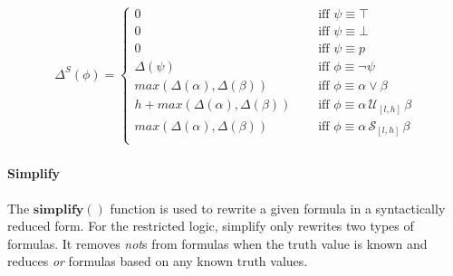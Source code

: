 \documentclass[]{../llncs/llncs}
\begin{document}
\begin{align*}
\Delta^{S}(\phi) = \left\lbrace
\begin{aligned}
0 & \quad \text{ iff } \psi \equiv \top \\
0 & \quad \text{ iff } \psi \equiv \bot \\
0 & \quad \text{ iff } \psi \equiv p \\
\Delta(\psi) & \quad \text{ iff } \phi \equiv \neg \psi \\
max(\Delta(\alpha),\Delta(\beta)) & \quad \text{ iff } \phi \equiv \alpha \vee \beta \\
h + max(\Delta(\alpha),\Delta(\beta)) & \quad \text{ iff } \phi \equiv \alpha\, \mathcal{U}_{[l,h]}\, \beta \\
max(\Delta(\alpha),\Delta(\beta)) & \quad \text{ iff } \phi \equiv \alpha\, \mathcal{S}_{[l,h]}\, \beta \\
\end{aligned} \right. 
\end{align*}


\paragraph{Simplify}
The $\mathbf{simplify()}$ function is used to rewrite a given formula in a syntactically reduced form. For the restricted logic, simplify only rewrites two types of formulas. It removes \emph{not}s from formulas when the truth value is known and reduces \emph{or} formulas based on any known truth values. 
\end{document}
